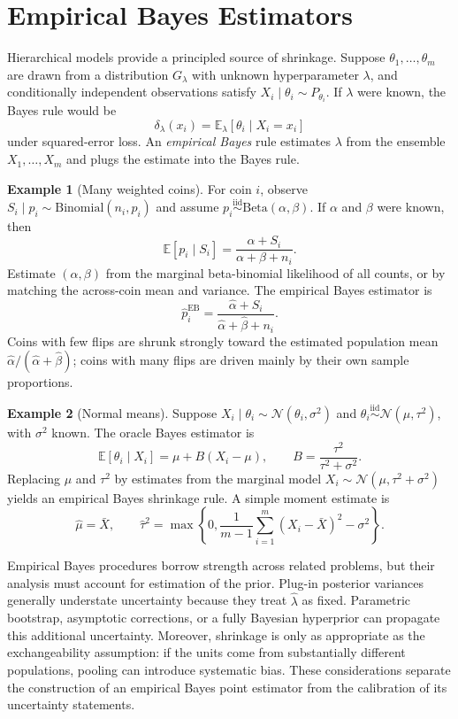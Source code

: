 \documentclass[12pt,oneside]{book}
\numberwithin{equation}{section}
\theoremstyle{definition}
\newtheorem{example}{Example}[section]
\theoremstyle{plain}
\theoremstyle{remark}
\newcommand{\E}{\mathbb{E}}
\newcommand{\iid}{\overset{\text{iid}}{\sim}}
\newcommand{\Normal}{\mathcal{N}}
\newcommand{\Bin}{\mathrm{Binomial}}
\newcommand{\BetaDist}{\mathrm{Beta}}
\begin{document}
\section{Empirical Bayes Estimators}

Hierarchical models provide a principled source of shrinkage.  Suppose
$\theta_1,\ldots,\theta_m$ are drawn from a distribution $G_\lambda$ with
unknown hyperparameter $\lambda$, and conditionally independent observations
satisfy $X_i\mid\theta_i\sim P_{\theta_i}$.  If $\lambda$ were known, the Bayes
rule would be
\[
    \delta_\lambda(x_i)=\E_\lambda[\theta_i\mid X_i=x_i]
\]
under squared-error loss.  An \emph{empirical Bayes} rule estimates
$\lambda$ from the ensemble $X_1,\ldots,X_m$ and plugs the estimate into the
Bayes rule.

\begin{example}[Many weighted coins]
For coin $i$, observe $S_i\mid p_i\sim\Bin(n_i,p_i)$ and assume
$p_i\iid\BetaDist(\alpha,\beta)$.  If $\alpha$ and $\beta$ were known, then
\[
    \E[p_i\mid S_i]
    =\frac{\alpha+S_i}{\alpha+\beta+n_i}.
\]
Estimate $(\alpha,\beta)$ from the marginal beta-binomial likelihood of all
counts, or by matching the across-coin mean and variance.  The empirical
Bayes estimator is
\[
    \widehat p_i^{\mathrm{EB}}
    =\frac{\widehat\alpha+S_i}
           {\widehat\alpha+\widehat\beta+n_i}.
\]
Coins with few flips are shrunk strongly toward the estimated population mean
$\widehat\alpha/(\widehat\alpha+\widehat\beta)$; coins with many flips are
driven mainly by their own sample proportions.
\end{example}

\begin{example}[Normal means]
Suppose $X_i\mid\theta_i\sim\Normal(\theta_i,\sigma^2)$ and
$\theta_i\iid\Normal(\mu,\tau^2)$, with $\sigma^2$ known.  The oracle Bayes
estimator is
\[
 \E[\theta_i\mid X_i]
 =\mu+B(X_i-\mu),
 \qquad B=\frac{\tau^2}{\tau^2+\sigma^2}.
\]
Replacing $\mu$ and $\tau^2$ by estimates from the marginal model
$X_i\sim\Normal(\mu,\tau^2+\sigma^2)$ yields an empirical Bayes shrinkage
rule.  A simple moment estimate is
\[
    \widehat\mu=\bar X,
    \qquad
    \widehat\tau^2=\max\left\{0,
       \frac{1}{m-1}\sum_{i=1}^m(X_i-\bar X)^2-\sigma^2\right\}.
\]
\end{example}

Empirical Bayes procedures borrow strength across related problems, but their
analysis must account for estimation of the prior.  Plug-in posterior
variances generally understate uncertainty because they treat
$\widehat\lambda$ as fixed.  Parametric bootstrap, asymptotic corrections, or
a fully Bayesian hyperprior can propagate this additional uncertainty.
Moreover, shrinkage is only as appropriate as the exchangeability assumption:
if the units come from substantially different populations, pooling can
introduce systematic bias.  These considerations separate the construction
of an empirical Bayes point estimator from the calibration of its uncertainty
statements.
\end{document}
